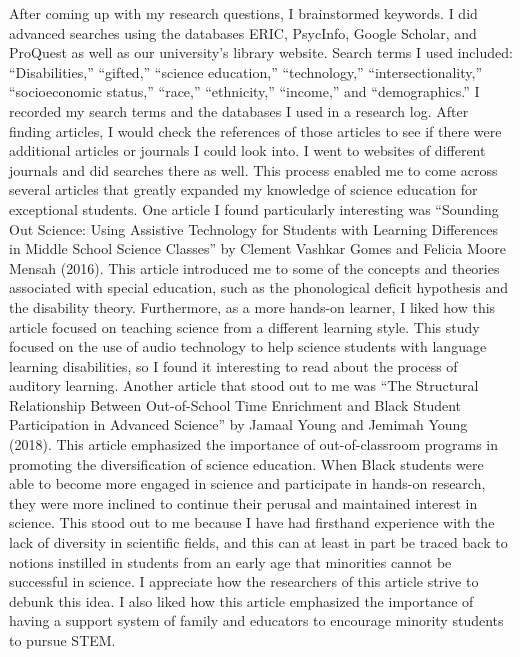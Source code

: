 \documentclass[11.5pt]{sig-alternate}
\begin{document}
\begin{large}
After coming up with my research questions, I brainstormed keywords. I did advanced searches using the databases ERIC, PsycInfo, Google Scholar, and ProQuest as well as our university’s library website. Search terms I used included: “Disabilities,” “gifted,” “science education,” “technology,” “intersectionality,” “socioeconomic status,” “race,” “ethnicity,” “income,” and “demographics.” I recorded my search terms and the databases I used in a research log. After finding articles, I would check the references of those articles to see if there were additional articles or journals I could look into. I went to websites of different journals and did searches there as well. This process enabled me to come across several articles that greatly expanded my knowledge of science education for exceptional students. One article I found particularly interesting was “Sounding Out Science: Using Assistive Technology for Students with Learning Differences in Middle School Science Classes” by Clement Vashkar Gomes and Felicia Moore Mensah (2016). This article introduced me to some of the concepts and theories associated with special education, such as the phonological deficit hypothesis and the disability theory. Furthermore, as a more hands-on learner, I liked how this article focused on teaching science from a different learning style. This study focused on the use of audio technology to help science students with language learning disabilities, so I found it interesting to read about the process of auditory learning. Another article that stood out to me was “The Structural Relationship Between Out-of-School Time Enrichment and Black Student Participation in Advanced Science” by Jamaal Young and Jemimah Young (2018). This article emphasized the importance of out-of-classroom programs in promoting the diversification of science education. When Black students were able to become more engaged in science and participate in hands-on research, they were more inclined to continue their perusal and maintained interest in science. This stood out to me because I have had firsthand experience with the lack of diversity in scientific fields, and this can at least in part be traced back to notions instilled in students from an early age that minorities cannot be successful in science. I appreciate how the researchers of this article strive to debunk this idea. I also liked how this article emphasized the importance of having a support system of family and educators to encourage minority students to pursue STEM.


\end{large}
\end{document}
